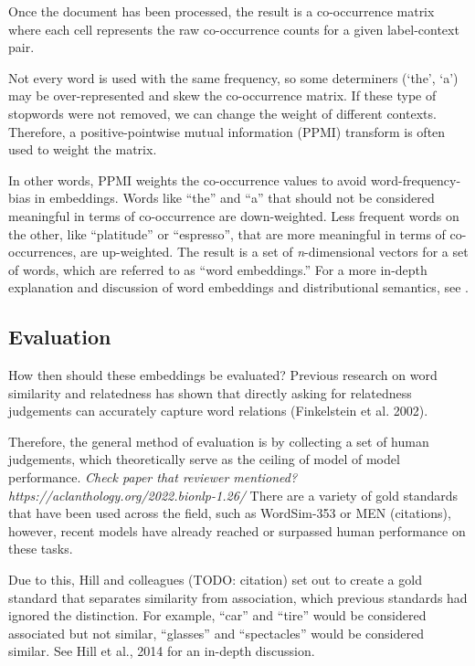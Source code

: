 Once the document has been processed, the result is a co-occurrence matrix where each cell represents the raw co-occurrence counts for a given label-context pair.


Not every word is used with the same frequency, so some determiners (`the', `a') may be over-represented and skew the co-occurrence matrix. If these type of stopwords were not removed, we can change the weight of different contexts. Therefore, a positive-pointwise mutual information (PPMI) transform is often used to weight the matrix. 

In other words, PPMI weights the co-occurrence values to avoid word-frequency-bias in embeddings. Words like ``the'' and ``a'' that should not be considered meaningful in terms of co-occurrence are down-weighted. Less frequent words on the other, like ``platitude'' or ``espresso'', that are more meaningful in terms of co-occurrences, are up-weighted. The result is a set of \textit{n}-dimensional vectors for a set of words, which are referred to as ``word embeddings.'' For a more in-depth explanation and discussion of word embeddings and distributional semantics, see \cite{lenci2018distributional}.


\subsection{Evaluation}

How then should these embeddings be evaluated? Previous research on word similarity and relatedness has shown that directly asking for relatedness judgements can accurately capture word relations (Finkelstein et al. 2002).

Therefore, the general method of evaluation is by collecting a set of human judgements, which theoretically serve as the ceiling of model of model performance. \textit{Check paper that reviewer mentioned? https://aclanthology.org/2022.bionlp-1.26/}
There are a variety of gold standards that have been used across the field, such as WordSim-353 or MEN (citations), however, recent models have already reached or surpassed human performance on these tasks.

Due to this, Hill and colleagues (TODO: citation) set out to create a gold standard that separates similarity from association, which previous standards had ignored the distinction.
For example, ``car'' and ``tire'' would be considered associated but not similar, ``glasses'' and ``spectacles'' would be considered similar. See Hill et al., 2014 for an in-depth discussion.

